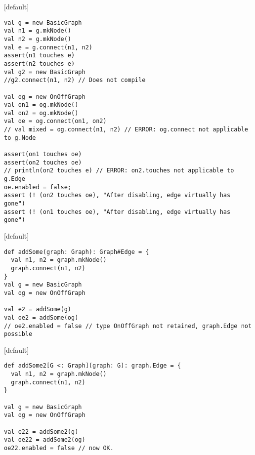 \documentclass{beamer}
\makeatletter
\newenvironment{withoutheadline}{
        \setbeamertemplate{headline}[default]
        \def\beamer@entrycode{\vspace*{-\headheight}}
    }{}
\makeatother
\begin{document}
\begin{withoutheadline}
\begin{frame}[fragile]{}
\centering
\begin{verbatim}
val g = new BasicGraph
val n1 = g.mkNode()
val n2 = g.mkNode()
val e = g.connect(n1, n2)
assert(n1 touches e)
assert(n2 touches e)
val g2 = new BasicGraph
//g2.connect(n1, n2) // Does not compile

val og = new OnOffGraph
val on1 = og.mkNode()
val on2 = og.mkNode()
val oe = og.connect(on1, on2)
// val mixed = og.connect(n1, n2) // ERROR: og.connect not applicable to g.Node

assert(on1 touches oe)
assert(on2 touches oe)
// println(on2 touches e) // ERROR: on2.touches not applicable to g.Edge
oe.enabled = false;
assert (! (on2 touches oe), "After disabling, edge virtually has gone")
assert (! (on1 touches oe), "After disabling, edge virtually has gone")
\end{verbatim}
\end{frame}
\end{withoutheadline}

\begin{withoutheadline}
\begin{frame}[fragile]{}
\centering
\begin{verbatim}
def addSome(graph: Graph): Graph#Edge = {
  val n1, n2 = graph.mkNode()
  graph.connect(n1, n2)
}
val g = new BasicGraph
val og = new OnOffGraph

val e2 = addSome(g)
val oe2 = addSome(og)
// oe2.enabled = false // type OnOffGraph not retained, graph.Edge not possible
\end{verbatim}
\end{frame}
\end{withoutheadline}

\begin{withoutheadline}
\begin{frame}[fragile]{}
\centering
\begin{verbatim}
def addSome2[G <: Graph](graph: G): graph.Edge = {
  val n1, n2 = graph.mkNode()
  graph.connect(n1, n2)
}

val g = new BasicGraph
val og = new OnOffGraph

val e22 = addSome2(g)
val oe22 = addSome2(og)
oe22.enabled = false // now OK.
\end{verbatim}
\end{frame}
\end{withoutheadline}
\end{document}
